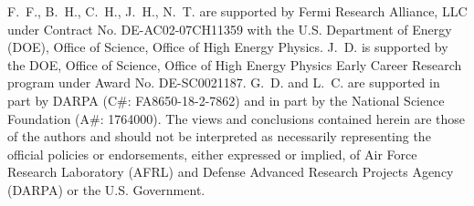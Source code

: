 \documentclass[tinyml]{acmart}
\newcommand{\noind}[0]{\vspace{5 pt} \noindent}
\newcommand{\noindpar}[1]{\noind {\bf #1}}
\begin{document}



\begin{acks}
F.~F., B.~H., C.~H., J.~H., N.~T. are supported by Fermi Research Alliance, LLC under Contract No. DE-AC02-07CH11359 with the U.S. Department of Energy (DOE), Office of Science, Office of High Energy Physics.
J.~D. is supported by the DOE, Office of Science, Office of High Energy Physics Early Career Research program under Award No. DE-SC0021187.
G.~D. and L.~C. are supported in part by DARPA (C\#: FA8650-18-2-7862) and in part by the National Science Foundation (A\#: 1764000).
The views and conclusions contained herein are those of the authors and should not be interpreted as necessarily representing the official policies or endorsements, either expressed or implied, of Air Force Research Laboratory (AFRL) and Defense Advanced Research Projects Agency (DARPA) or the U.S. Government.
\end{acks}



\end{document}
